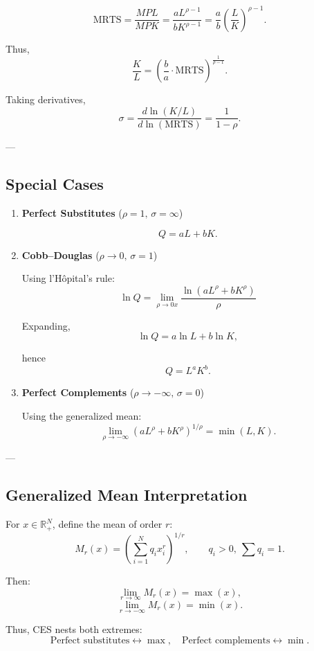 \[
\text{MRTS}
=
\frac{MPL}{MPK}
=
\frac{a L^{\rho-1}}{b K^{\rho-1}}
=
\frac{a}{b} \left(\frac{L}{K}\right)^{\rho-1}.
\]

Thus,
\[
\frac{K}{L}
=
\left(\frac{b}{a} \cdot \text{MRTS} \right)^{\frac{1}{\rho-1}}.
\]

Taking derivatives,
\[
\sigma
=
\frac{d \ln(K/L)}{d \ln(\text{MRTS})}
=
\frac{1}{1-\rho}.
\]

---

\subsection*{Special Cases}

\begin{enumerate}
    \item \textbf{Perfect Substitutes} ($\rho = 1, \, \sigma=\infty$)

    \[
    Q = aL + bK.
    \]

    \item \textbf{Cobb--Douglas} ($\rho \to 0, \, \sigma=1$)

    Using l'H\^opital's rule:
    \[
    \ln Q
    =
    \lim_{\rho \to 0x}
    \frac{\ln(aL^\rho + bK^\rho)}{\rho}
    \]

    Expanding,
    \[
    \ln Q = a \ln L + b \ln K,
    \]

    hence
    \[
    Q = L^a K^b.
    \]

    \item \textbf{Perfect Complements} ($\rho \to -\infty, \, \sigma=0$)

    Using the generalized mean:
    \[
    \lim_{\rho \to -\infty}
    \left( aL^\rho + bK^\rho \right)^{1/\rho}
    =
    \min(L,K).
    \]
\end{enumerate}

---

\subsection*{Generalized Mean Interpretation}

For $x \in \mathbb{R}_+^N$, define the mean of order $r$:
\[
M_r(x)
=
\left( \sum_{i=1}^N q_i x_i^r \right)^{1/r},
\qquad q_i > 0,\ \sum q_i = 1.
\]

Then:
\[
\lim_{r \to \infty} M_r(x) = \max(x),
\]
\[
\lim_{r \to -\infty} M_r(x) = \min(x).
\]

Thus, CES nests both extremes:
\[
\text{Perfect substitutes} \leftrightarrow \max,
\quad
\text{Perfect complements} \leftrightarrow \min.
\]

